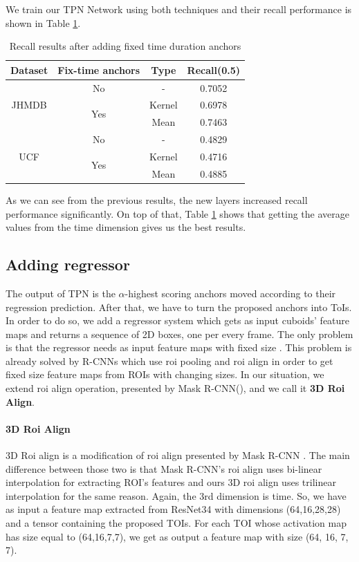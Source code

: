 We train our TPN Network using both techniques and their recall performance is shown in Table \ref{table:add_16}.

\begin{table}[h]
  \centering
  \begin{tabular}{||c | c | c || c ||}
    \hline
    \textbf{Dataset} & \textbf{Fix-time anchors} & \textbf{Type} & \textbf{Recall(0.5)} \\
    \hline  \hline
    \multirow{3}{4em}{JHMDB} & No &  - & 0.7052 \\
    \cline{2-4}
    {} & \multirow{2}{*}{Yes} & Kernel & 0.6978 \\
    \cline{3-4}
    {} & {} & Mean & 0.7463 \\
    \hline
    \multirow{3}{4em}{UCF} & No & - & 0.4829 \\
    \cline{2-4}
    {} & \multirow{2}{*}{Yes} & Kernel & 0.4716 \\
    \cline{3-4}
    {} & {} & Mean & 0.4885 \\
    \hline      
  \end{tabular}
  \caption{Recall results after adding fixed time duration anchors}
  \label{table:add_16}
\end{table}

As we can see from the previous results, the new layers increased recall performance significantly. On top of that, Table \ref{table:add_16} shows that
getting the average values from the time dimension gives us the best results.


\subsection{Adding regressor}
The output of TPN is the $\alpha$-highest scoring anchors moved according to their regression prediction. After that, we have to turn the proposed anchors into ToIs.
In order to do so, we add a regressor system which gets as input cuboids' feature maps and returns a sequence of 2D boxes, one per every frame.
The only problem is that the regressor needs as input feature maps with fixed size . This problem is already solved by R-CNNs which use roi pooling and roi align
in order to get fixed size feature maps from ROIs with changing sizes. In our situation, we extend roi align operation, presented by Mask R-CNN(\cite{DBLP:journals/corr/HeGDG17}),
and we
call it \textbf{3D Roi Align}.

\paragraph{3D Roi Align}
3D Roi align is a modification of roi align presented by Mask R-CNN . The main difference between those two is that Mask R-CNN's roi align uses
bi-linear interpolation for extracting ROI's features and ours 3D roi align uses trilinear interpolation for the same reason. Again, the 3rd dimension is
time.
So, we have as input a feature map extracted from ResNet34 with dimensions (64,16,28,28) and a tensor containing the proposed TOIs.
For each TOI whose activation map has size equal to (64,16,7,7), we get as output a feature map with size (64, 16, 7, 7). \par

